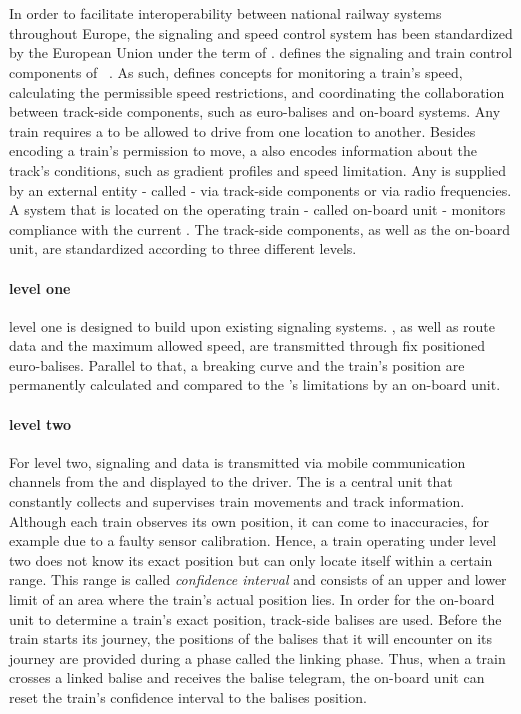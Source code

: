 \section{}
In order to facilitate interoperability between national railway systems throughout Europe, the signaling and speed control system has been standardized by the European Union under the term of .
 defines the signaling and train control components of ~\cite{ETCS26}.
As such,  defines concepts for monitoring a train's speed, calculating the permissible speed restrictions, and coordinating the collaboration between track-side components, such as  euro-balises and on-board systems.
Any train requires a  to be allowed to drive from one location to another.
Besides encoding a train's permission to move, a  also encodes information about the track's conditions, such as gradient profiles and speed limitation.
Any  is supplied by an external entity - called  - via track-side components or via radio frequencies.
A system that is located on the operating train - called on-board unit - monitors compliance with the current .
The track-side components, as well as the on-board unit, are standardized according to three different  levels.

\paragraph{ level one}
 level one is designed to build upon existing signaling systems.
, as well as route data and the maximum allowed speed, are transmitted through fix positioned euro-balises.
Parallel to that, a breaking curve and the train's position are permanently calculated and compared to the 's limitations by an on-board unit.

\paragraph{ level two}
For  level two, signaling and  data is transmitted via mobile communication channels from the  and displayed to the driver.
The  is a central unit that constantly collects and supervises train movements and track information.
Although each train observes its own position, it can come to inaccuracies, for example due to a faulty sensor calibration.
Hence, a train operating under  level two does not know its exact position but can only locate itself within a certain range.
This range is called \textit{confidence interval} and consists of an upper and lower limit of an area where the train's actual position lies.
In order for the on-board unit to determine a train's exact position, track-side balises are used.
Before the train starts its journey, the positions of the balises that it will encounter on its journey are provided during a phase called the linking phase.
Thus, when a train crosses a linked balise and receives the balise telegram, the on-board unit can reset the train's confidence interval to the balises position.

